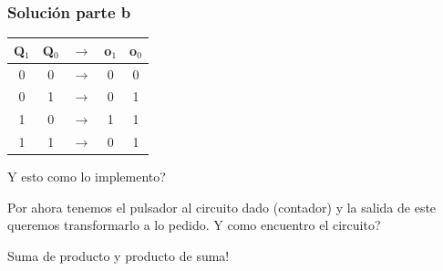 \documentclass[10pt]{beamer}
\begin{document}
\begin{frame}
  \frametitle{Solución parte b}
\begin{table}[h!]
\begin{tabular}{|c|c|c|c|c|}
\hline
Q$_1$ & Q$_0$ & $\to$ & o$_1$ & o$_0$ \\ \hline
0        & 0        & $\to$ & 0          & 0          \\ \hline
0        & 1        &$\to$  & 0          & 1          \\ \hline
1        & 0        &$\to$  & 1          & 1          \\ \hline
1        & 1        &$\to$  & 0          & 1          \\ \hline
\end{tabular}
\end{table}

\pause
Y esto como lo implemento?
\pause

Por ahora tenemos el pulsador al circuito dado (contador) y la salida de este
queremos transformarlo a lo pedido. Y como encuentro el circuito?

\pause
Suma de producto y producto de suma!
\end{frame}
\end{document}
